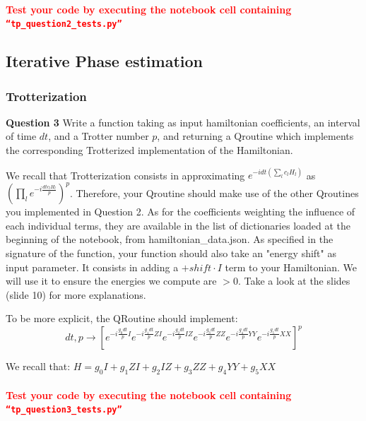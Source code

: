 \documentclass{article}
\begin{document}
\paragraph{} \textbf{\textcolor{red}{Test your code by executing the notebook cell containing {\tt ``tp\_question2\_tests.py''}}}

\subsection{Iterative Phase estimation}

\subsubsection{Trotterization}

\textbf{Question 3} Write a function taking as input hamiltonian
coefficients, an interval of time $dt$,  and a Trotter number $p$, 
and returning a Qroutine which implements the corresponding
Trotterized implementation of the Hamiltonian.

We recall that Trotterization consists in approximating $e^{-idt\left(\sum_{l}c_{l}H_{l}\right)}$ as
$\left(\prod_{l}e^{-i\frac{dt c_{l} H_{l}}{p}}\right)^{p}$. Therefore, your Qroutine should make use of
the other Qroutines you implemented in Question 2. As for the coefficients weighting the influence
of each individual terms, they are available in the list of dictionaries loaded at the beginning
of the notebook, from {\selectfont hamiltonian\_data.json}. As specified in the signature of the function,
your function should also take an "energy shift" as input parameter. It consists in adding a $+shift\cdot I$
term to your Hamiltonian. We will use it to ensure the energies we compute are $>0$. Take a look at the 
slides (slide 10) for more explanations.

To be more explicit, the QRoutine should implement:
$$ dt, p \rightarrow \left[e^{-i\frac{g_{0}dt}{p}I}e^{-i\frac{g_{1}dt}{p}ZI}e^{-i\frac{g_{2}dt}{p}IZ}e^{-i\frac{g_{3}dt}{p}ZZ}e^{-i\frac{g_{4}dt}{p}YY}e^{-i\frac{g_{5}dt}{p}XX}\right]^{p} $$

We recall that: $H=g_{0}I + g_{1}ZI + g_{2}IZ + g_{3}ZZ + g_{4}YY + g_{5}XX$

\paragraph{} \textbf{\textcolor{red}{Test your code by executing the notebook cell containing {\tt ``tp\_question3\_tests.py''}}}
\end{document}
